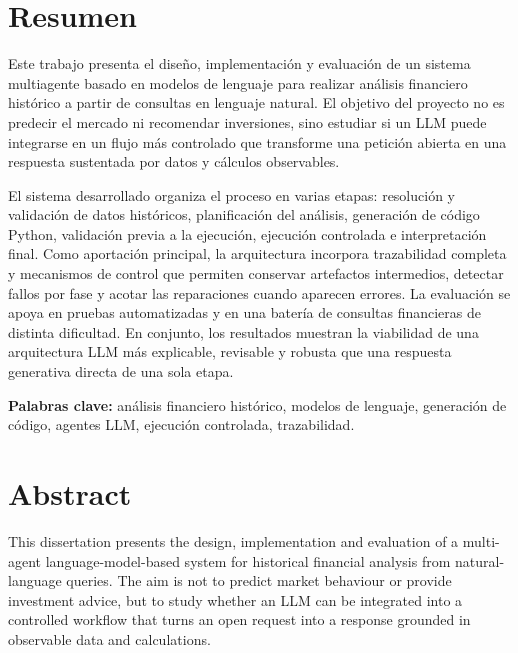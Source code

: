 \documentclass[12pt,a4paper]{report}
\begin{document}
\hypersetup{pageanchor=false}
\pagestyle{empty}

\clearpage
\hypersetup{pageanchor=true}
\pagestyle{plain}

\chapter*{Resumen}
Este trabajo presenta el dise\~no, implementaci\'on y evaluaci\'on de un sistema multiagente basado en modelos de lenguaje para realizar an\'alisis financiero hist\'orico a partir de consultas en lenguaje natural. El objetivo del proyecto no es predecir el mercado ni recomendar inversiones, sino estudiar si un LLM puede integrarse en un flujo m\'as controlado que transforme una petici\'on abierta en una respuesta sustentada por datos y c\'alculos observables.

El sistema desarrollado organiza el proceso en varias etapas: resoluci\'on y validaci\'on de datos hist\'oricos, planificaci\'on del an\'alisis, generaci\'on de c\'odigo Python, validaci\'on previa a la ejecuci\'on, ejecuci\'on controlada e interpretaci\'on final. Como aportaci\'on principal, la arquitectura incorpora trazabilidad completa y mecanismos de control que permiten conservar artefactos intermedios, detectar fallos por fase y acotar las reparaciones cuando aparecen errores. La evaluaci\'on se apoya en pruebas automatizadas y en una bater\'ia de consultas financieras de distinta dificultad. En conjunto, los resultados muestran la viabilidad de una arquitectura LLM m\'as explicable, revisable y robusta que una respuesta generativa directa de una sola etapa.

\vspace{0.5cm}
\noindent\textbf{Palabras clave:} an\'alisis financiero hist\'orico, modelos de lenguaje, generaci\'on de c\'odigo, agentes LLM, ejecuci\'on controlada, trazabilidad.
\clearpage

\chapter*{Abstract}
This dissertation presents the design, implementation and evaluation of a multi-agent language-model-based system for historical financial analysis from natural-language queries. The aim is not to predict market behaviour or provide investment advice, but to study whether an LLM can be integrated into a controlled workflow that turns an open request into a response grounded in observable data and calculations.
\end{document}
